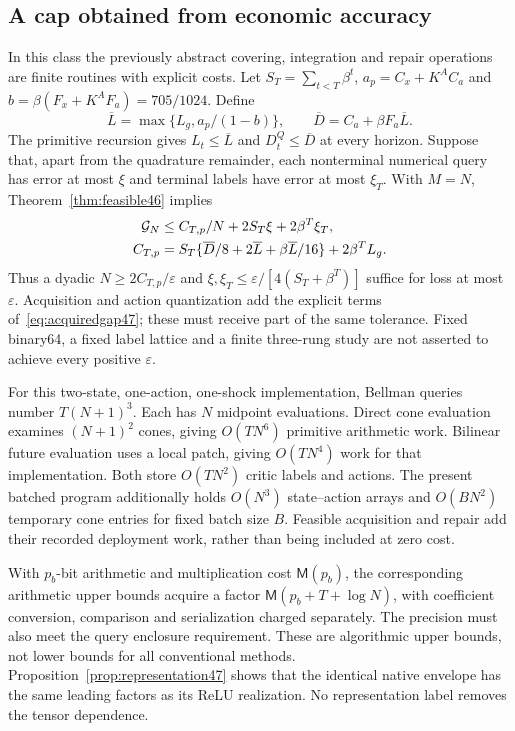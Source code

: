 \subsection{A cap obtained from economic accuracy}
In this class the previously abstract covering, integration and repair operations are finite routines with explicit costs. Let $S_T=\sum_{t<T}\beta^t$, $a_p=C_x+K^AC_a$ and $b=\beta(F_x+K^AF_a)=705/1024$. Define
\[
 \overline L=\max\{L_g,a_p/(1-b)\},\qquad
 \overline D=C_a+\beta F_a\overline L.
\]
The primitive recursion gives $L_t\le\overline L$ and $D_t^Q\le\overline D$ at every horizon. Suppose that, apart from the quadrature remainder, each nonterminal numerical query has error at most $\xi$ and terminal labels have error at most $\xi_T$. With $M=N$, Theorem~\ref{thm:feasible46} implies
\begin{align}\label{eq:explicitcap47}
 \mathcal G_N&\le C_{T,p}/N+2S_T\xi+2\beta^T\xi_T,\\
 C_{T,p}&=S_T\{\overline D/8+2\overline L+\beta\overline L/16\}
                     +2\beta^TL_g.\notag
\end{align}
Thus a dyadic $N\ge2C_{T,p}/\varepsilon$ and $\xi,\xi_T\le\varepsilon/[4(S_T+\beta^T)]$ suffice for loss at most $\varepsilon$. Acquisition and action quantization add the explicit terms of~\eqref{eq:acquiredgap47}; these must receive part of the same tolerance. Fixed binary64, a fixed label lattice and a finite three-rung study are not asserted to achieve every positive $\varepsilon$.

For this two-state, one-action, one-shock implementation, Bellman queries number $T(N+1)^3$. Each has $N$ midpoint evaluations. Direct cone evaluation examines $(N+1)^2$ cones, giving $O(TN^6)$ primitive arithmetic work. Bilinear future evaluation uses a local patch, giving $O(TN^4)$ work for that implementation. Both store $O(TN^2)$ critic labels and actions. The present batched program additionally holds $O(N^3)$ state--action arrays and $O(BN^2)$ temporary cone entries for fixed batch size $B$. Feasible acquisition and repair add their recorded deployment work, rather than being included at zero cost.

With $p_b$-bit arithmetic and multiplication cost $\mathsf M(p_b)$, the corresponding arithmetic upper bounds acquire a factor $\mathsf M(p_b+T+\log N)$, with coefficient conversion, comparison and serialization charged separately. The precision must also meet the query enclosure requirement. These are algorithmic upper bounds, not lower bounds for all conventional methods. Proposition~\ref{prop:representation47} shows that the identical native envelope has the same leading factors as its ReLU realization. No representation label removes the tensor dependence.

